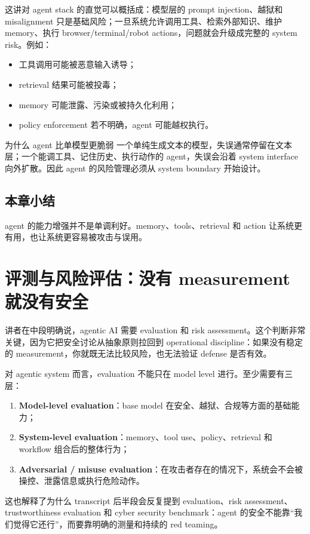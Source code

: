 \documentclass[a4paper]{article}
\begin{document}
这讲对 agent stack 的直觉可以概括成：模型层的 prompt injection、越狱和 misalignment 只是基础风险；一旦系统允许调用工具、检索外部知识、维护 memory、执行 browser/terminal/robot actions，问题就会升级成完整的 system risk。例如：
\begin{itemize}[leftmargin=1.5em]
\item 工具调用可能被恶意输入诱导；
\item retrieval 结果可能被投毒；
\item memory 可能泄露、污染或被持久化利用；
\item policy enforcement 若不明确，agent 可能越权执行。
\end{itemize}

\begin{warningbox}{为什么 agent 比单模型更脆弱}
一个单纯生成文本的模型，失误通常停留在文本层；一个能调工具、记住历史、执行动作的 agent，失误会沿着 system interface 向外扩散。因此 agent 的风险管理必须从 system boundary 开始设计。
\end{warningbox}

\subsection{本章小结}
agent 的能力增强并不是单调利好。memory、tools、retrieval 和 action 让系统更有用，也让系统更容易被攻击与误用。

\section{评测与风险评估：没有 measurement 就没有安全}
讲者在中段明确说，agentic AI 需要 evaluation 和 risk assessment。这个判断非常关键，因为它把安全讨论从抽象原则拉回到 operational discipline：如果没有稳定的 measurement，你就既无法比较风险，也无法验证 defense 是否有效。

对 agentic system 而言，evaluation 不能只在 model level 进行。至少需要有三层：
\begin{enumerate}[leftmargin=1.5em]
\item \textbf{Model-level evaluation}：base model 在安全、越狱、合规等方面的基础能力；
\item \textbf{System-level evaluation}：memory、tool use、policy、retrieval 和 workflow 组合后的整体行为；
\item \textbf{Adversarial / misuse evaluation}：在攻击者存在的情况下，系统会不会被操控、泄露信息或执行危险动作。
\end{enumerate}

这也解释了为什么 transcript 后半段会反复提到 evaluation、risk assessment、trustworthiness evaluation 和 cyber security benchmark：agent 的安全不能靠“我们觉得它还行”，而要靠明确的测量和持续的 red teaming。
\end{document}
